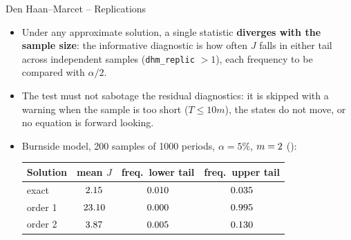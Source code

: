\documentclass[11pt,aspectratio=169]{beamer}
\newcommand{\code}[1]{\texttt{#1}}
\begin{document}
\begin{frame}{Den Haan--Marcet -- Replications}

\begin{itemize}

\item Under any approximate solution, a single statistic \textbf{diverges with the sample size}: the informative diagnostic is how often $J$ falls in either tail across independent samples (\code{dhm\_replic} $>1$), each frequency to be compared with $\alpha/2$.\newline

\item The test must not sabotage the residual diagnostics: it is skipped with a warning when the sample is too short ($T\le 10m$), the states do not move, or no equation is forward looking.\newline

\item Burnside model, 200 samples of 1000 periods, $\alpha=5\%$, $m=2$ (\dhmInstruments):
\begin{center}
\small
\renewcommand{\arraystretch}{1.2}
\begin{tabular}{lccc}
    \toprule
    Solution & mean $J$ & freq.\ lower tail & freq.\ upper tail \\
    \midrule
    exact & $2.15$ & $0.010$ & $0.035$ \\
    order 1 & $23.10$ & $0.000$ & $0.995$ \\
    order 2 & $3.87$ & $0.005$ & $0.130$ \\
    \bottomrule
\end{tabular}
\end{center}

\end{itemize}

\end{frame}
\end{document}
